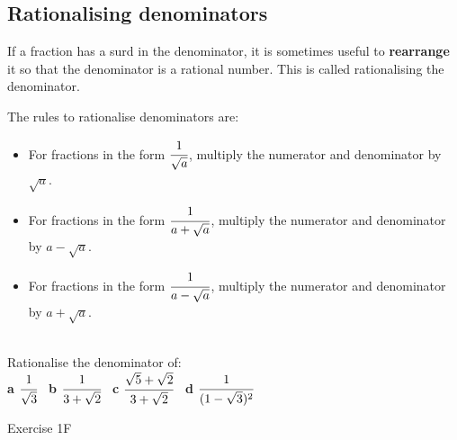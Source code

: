 \documentclass[fleqn]{article}
\begin{document}
\subsection{Rationalising denominators}
\begin{mybox2}[colbacktitle=green]{}
	If a fraction has a surd in the denominator, it is sometimes useful to \textbf{rearrange} it so that the denominator is a rational number. This is called rationalising the denominator.
	\vspace{2mm}
	
	\textbullet\space The rules to rationalise denominators are:\vspace{-2mm}
	\begin{itemize}
		\setlength{\itemsep}{-3pt}%
		\item For fractions in the form $\cfrac{1}{\sqrt{a}}$, multiply the numerator and denominator by $\sqrt{a}$.
		\item For fractions in the form $\cfrac{1}{a+\sqrt{a}}$, multiply the numerator and denominator by $a-\sqrt{a}$.
		\item For fractions in the form $\cfrac{1}{a-\sqrt{a}}$, multiply the numerator and denominator by $a+\sqrt{a}$.
	\end{itemize}

\end{mybox2}
\begin{examplebox}{}{}
	\\ %
	Rationalise the denominator of: \\
	\textbf{a}\hspace{2mm} $\cfrac{1}{\sqrt{3}}$						\hspace{20mm} \
	\textbf{b}\hspace{2mm} $\cfrac{1}{3+\sqrt{2}}$					\hspace{20mm} \
	\textbf{c}\hspace{2mm} $\cfrac{\sqrt{5}+\sqrt{2}}{3+\sqrt{2}}$	\hspace{20mm} \
	\textbf{d}\hspace{2mm} $\cfrac{1}{(1-\sqrt{3})^2}$				\hspace{20mm} \
\end{examplebox}

\vfill
\begin{practice*}{Exercise 1F}{}
\end{practice*}
\newpage
\end{document}
